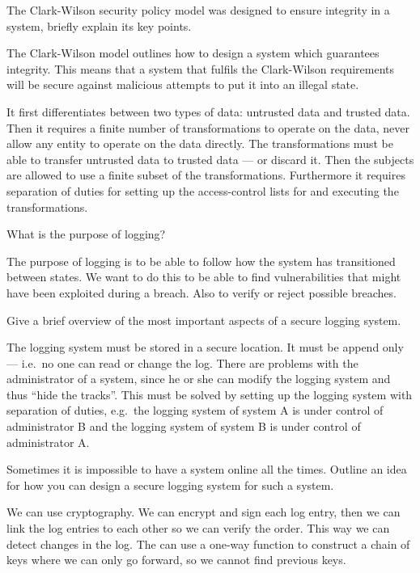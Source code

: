 \question[6]\label{q:accountability}
The Clark-Wilson security policy model was designed to ensure integrity in 
a system, briefly explain its key points.

\begin{solution}
  The Clark-Wilson model outlines how to design a system which guarantees 
  integrity.
  This means that a system that fulfils the Clark-Wilson requirements will be 
  secure against malicious attempts to put it into an illegal state.

  It first differentiates between two types of data: untrusted data and trusted 
  data.
  Then it requires a finite number of transformations to operate on the data, 
  never allow any entity to operate on the data directly.
  The transformations must be able to transfer untrusted data to trusted data 
  --- or discard it.
  Then the subjects are allowed to use a finite subset of the transformations.
  Furthermore it requires separation of duties for setting up the 
  access-control lists for and executing the transformations.
\end{solution}


\question[2]\label{q:accountability}
What is the purpose of logging?

\begin{solution}
  The purpose of logging is to be able to follow how the system has 
  transitioned between states.
  We want to do this to be able to find vulnerabilities that might have been 
  exploited during a breach.
  Also to verify or reject possible breaches.
\end{solution}


\question[3]\label{q:accountability}
Give a brief overview of the most important aspects of a secure logging system.

\begin{solution}
  The logging system must be stored in a secure location.
  It must be append only --- i.e.\ no one can read or change the log.
  There are problems with the administrator of a system, since he or she can 
  modify the logging system and thus \enquote{hide the tracks}.
  This must be solved by setting up the logging system with separation of 
  duties, e.g.\ the logging system of system A is under control of 
  administrator B and the logging system of system B is under control of 
  administrator A.
\end{solution}


\question[5]\label{q:accountability}
Sometimes it is impossible to have a system online all the times.
Outline an idea for how you can design a secure logging system for such 
a system.

\begin{solution}
  We can use cryptography.
  We can encrypt and sign each log entry, then we can link the log entries to 
  each other so we can verify the order.
  This way we can detect changes in the log.
  The can use a one-way function to construct a chain of keys where we can only 
  go forward, so we cannot find previous keys.
\end{solution}
